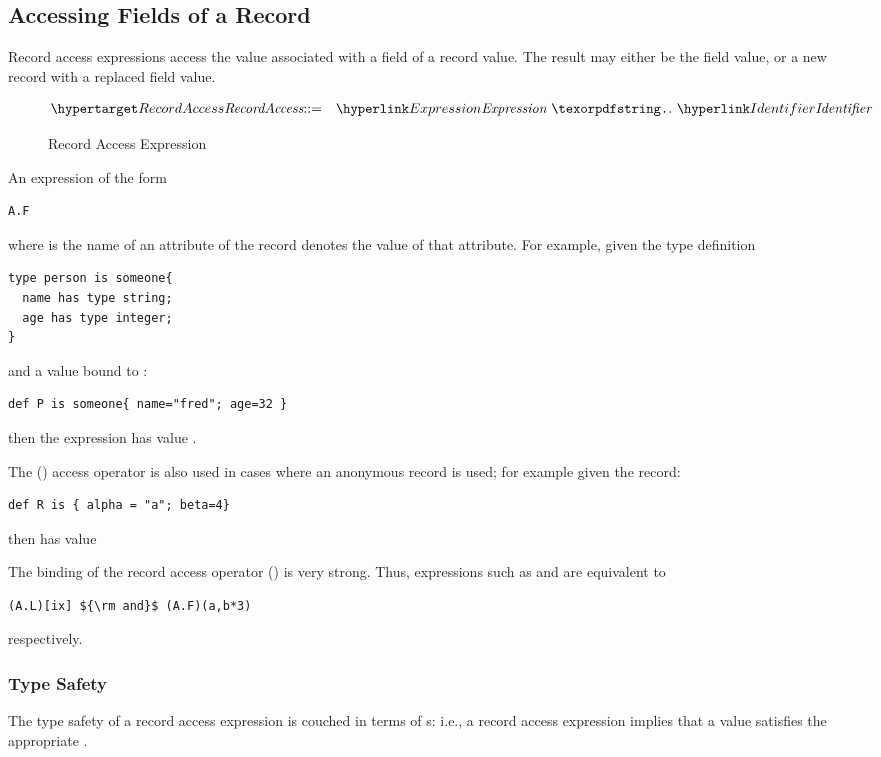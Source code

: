 \subsection{Accessing Fields of a Record}
\label{dotAccess}

Record access expressions access the value associated with a field of a record value. The result may either be the field value, or a new record with a replaced field value.

\begin{figure}[htbp]
\begin{eqnarray*}
\ntDef{RecordAccess}&\arrow&\ntRef{Expression}\ \q{.}\ \ntRef{Identifier}
\end{eqnarray*}
\caption{Record Access Expression}\label{recordAccessFig}
\end{figure}

An expression of the form
\begin{lstlisting}
A.F
\end{lstlisting}
where  is the name of an attribute of the record  denotes the value of that attribute. For example, given the type definition
\begin{lstlisting}
type person is someone{
  name has type string;
  age has type integer;
}
\end{lstlisting}
and a  value bound to :
\begin{lstlisting}
def P is someone{ name="fred"; age=32 }
\end{lstlisting}
then the expression  has value .

The () access operator is also used in cases where an anonymous record is used; for example given the record:
\begin{lstlisting}
def R is { alpha = "a"; beta=4}
\end{lstlisting}
then  has value 
\begin{aside}
The binding of the record access operator () is very strong. Thus, expressions such as 
 and 
are equivalent to
\begin{lstlisting}[mathescape=true]
(A.L)[ix] ${\rm and}$ (A.F)(a,b*3)
\end{lstlisting}
respectively.
\end{aside}

\subsubsection{Type Safety}
The type safety of a record access expression is couched in terms of s: i.e., a record access expression implies that a value satisfies the appropriate .

